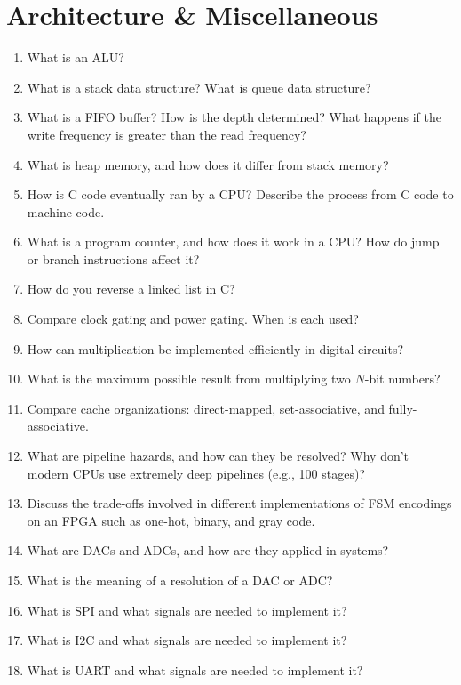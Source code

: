 \documentclass[11pt]{article}
\begin{document}
\section{Architecture \& Miscellaneous}
\begin{enumerate}
    \item What is an ALU?

    \item What is a stack data structure? What is queue data structure?

    \item What is a FIFO buffer? How is the depth determined? What happens if
    the write frequency is greater than the read frequency?

    \item What is heap memory, and how does it differ from stack memory?

    \item How is C code eventually ran by a CPU? Describe the process from C code to machine code.

    \item What is a program counter, and how does it work in a CPU? How do jump or branch instructions affect it?

    \item How do you reverse a linked list in C?

    \item Compare clock gating and power gating. When is each used?

    \item How can multiplication be implemented efficiently in digital
    circuits?

    \item What is the maximum possible result from multiplying two \(N\)-bit
    numbers?

    \item Compare cache organizations: direct-mapped, set-associative, and
    fully-associative.

    \item What are pipeline hazards, and how can they be resolved? Why don't
    modern CPUs use extremely deep pipelines (e.g., 100 stages)?

    \item Discuss the trade-offs involved in different implementations of FSM encodings on an FPGA such as
    one-hot, binary, and gray code.

    \item What are DACs and ADCs, and how are they applied in systems?

    \item What is the meaning of a resolution of a DAC or ADC?

    \item What is SPI and what signals are needed to implement it?

    \item What is I2C and what signals are needed to implement it?

    \item What is UART and what signals are needed to implement it?
\end{enumerate}
\end{document}
